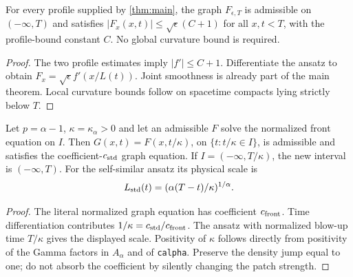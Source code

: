 \begin{lemma}
  \label{lem:c13_main_graph_admissible}
  For every profile supplied by \cref{thm:main}, the graph $F_{\epsilon,T}$ is admissible
  on $(-\infty,T)$ and satisfies
  $|F_x(x,t)|\le\sqrt\epsilon(C+1)$ for all $x,t<T$, with the profile-bound constant $C$.
  No global curvature bound is required.
\end{lemma}
\begin{proof}
  The two profile estimates imply $|f'|\le C+1$. Differentiate the ansatz to obtain
  $F_x=\sqrt\epsilon f'(x/L(t))$. Joint smoothness is already part of the main theorem.
  Local curvature bounds follow on spacetime compacts lying strictly below $T$.
\end{proof}

\begin{lemma}
  \label{lem:c13_time_normalization}
  Let $p=\alpha-1$, $\kappa=\kappa_\alpha>0$ and let an admissible $F$ solve the
  normalized front equation on $I$. Then
  $G(x,t)=F(x,t/\kappa)$, on $\{t:t/\kappa\in I\}$, is admissible and satisfies the
  coefficient-$c_{\rm std}$ graph equation. If $I=(-\infty,T/\kappa)$, the new interval is
  $(-\infty,T)$. For the self-similar ansatz its physical scale is
  \[
    L_{\rm std}(t)=(\alpha(T-t)/\kappa)^{1/\alpha}.
  \]
\end{lemma}
\begin{proof}
  The literal normalized graph equation has coefficient $c_{\rm front}$.
  Time differentiation contributes $1/\kappa=c_{\rm std}/c_{\rm front}$.
  The ansatz with normalized blow-up time $T/\kappa$ gives the displayed scale.
  Positivity of $\kappa$ follows directly from positivity of the Gamma factors in $A_\alpha$ and of \texttt{calpha}.
  Preserve the density jump equal to one; do not absorb the coefficient by silently changing the patch strength.
\end{proof}

